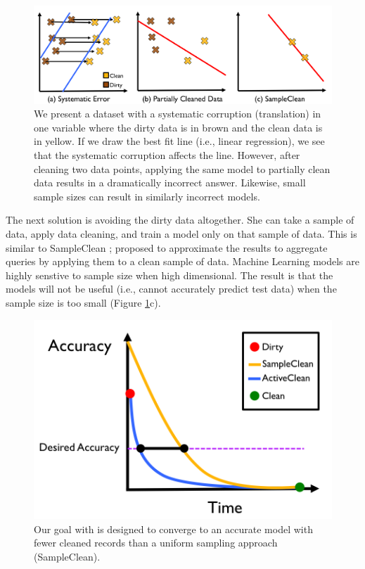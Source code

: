 \begin{figure}[ht!]
\centering
 \includegraphics[width=\columnwidth]{figs/update-arch.png}
 \caption{We present a dataset with a systematic corruption (translation) in one variable where the dirty data is in brown and the clean data is in yellow. If we draw the best fit line (i.e., linear regression), we see that the systematic corruption affects the line.
 However, after cleaning two data points, applying the same model to partially clean data results in a dramatically incorrect answer.
Likewise, small sample sizes can result in similarly incorrect models. \label{update-arch1}}
\end{figure}

The next solution is avoiding the dirty data altogether.
She can take a sample of data, apply data cleaning, and train a model only on that sample of data.
This is similar to SampleClean \cite{wang1999sample}; proposed to approximate the results to aggregate queries by applying them to a clean sample of data.
Machine Learning models are highly senstive to sample size when high dimensional.
The result is that the models will not be useful (i.e., cannot accurately predict test data) when the sample size is too small (Figure \ref{update-arch1}c).

\begin{figure}[t]
\centering
 \includegraphics[width=0.6\columnwidth]{figs/arch2.png}
 \caption{Our goal with \sys is designed to converge to an accurate model with fewer cleaned records than a uniform sampling approach (SampleClean). \label{sys-arch2}}
\end{figure}

